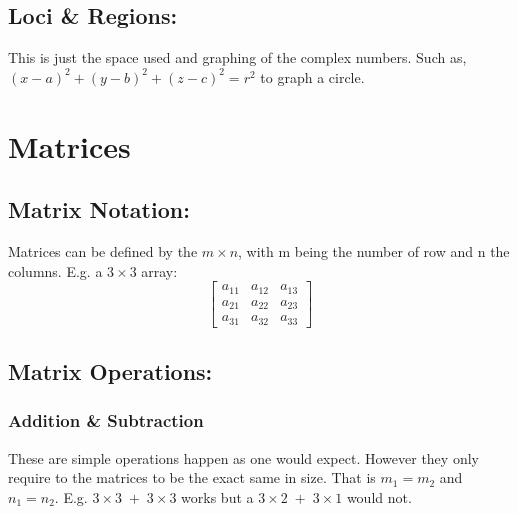 \documentclass[a5paper]{article}
\begin{document}
	\subsection{Loci \& Regions:}
	This is just the space used and graphing of the complex numbers. Such as,
	$(x-a)^{2}+(y-b)^{2}+(z-c)^{2}=r^{2}$ to graph a circle.

	\pagebreak

	\section{Matrices}
	\subsection{Matrix Notation:}
	Matrices can be defined by the $m\times n$, with m being the number of row and n the columns. E.g. a $3\times3$ array:
	$$
	\begin{bmatrix}
		a_{11} & a_{12} & a_{13}\\
		a_{21} & a_{22} & a_{23}\\
		a_{31} & a_{32} & a_{33}
	\end{bmatrix}
	$$
	
	\subsection{Matrix Operations:}
	\subsubsection{Addition \& Subtraction}
	These are simple operations happen as one would expect. However they only require to the matrices to be the exact same in size. That is $m_{1}=m_{2}$ and $n_{1}=n_{2}$. E.g. $3\times3\;+\;3\times3$ works but a $3\times2\;+\;3\times1$ would not.
\end{document}
